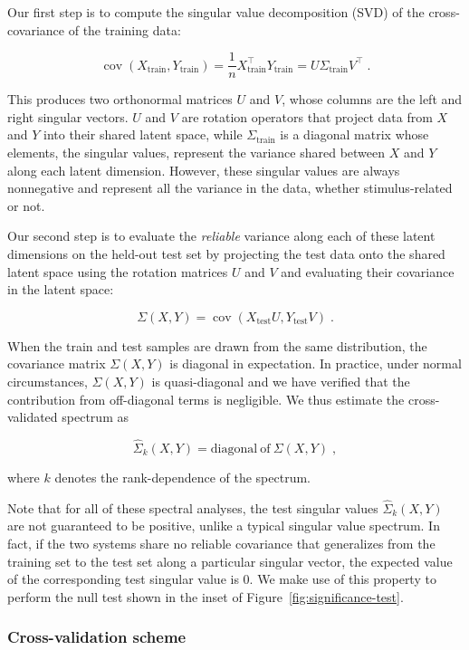 \documentclass[10pt]{article}
\begin{document}
Our first step is to compute the singular value decomposition (SVD) of the cross-covariance of the training data:

\[
    \operatorname{cov}
    \left(X_\text{train}, Y_\text{train}\right) = \frac{1}{n} X_\text{train}^\top Y_\text{train} = U \Sigma_\text{train} V^\top\;.
\]

This produces two orthonormal matrices \(U\) and \(V\), whose columns are the left and right singular vectors. \(U\) and \(V\) are rotation operators that project data from \(X\) and \(Y\) into their shared latent space, while \(\Sigma_\text{train}\) is a diagonal matrix whose elements, the singular values, represent the variance shared between \(X\) and \(Y\) along each latent dimension. However, these singular values are always nonnegative and represent all the variance in the data, whether stimulus-related or not.

Our second step is to evaluate the \emph{reliable} variance along each of these latent dimensions on the held-out test set by projecting the test data onto the shared latent space using the rotation matrices \(U\) and \(V\) and evaluating their covariance in the latent space:

\[
    \Sigma(X, Y) = \operatorname{cov}
    \left(X_\text{test}U, Y_\text{test} V \right)\;.
\]

When the train and test samples are drawn from the same distribution, the covariance matrix \(\Sigma(X, Y)\) is diagonal in expectation. In practice, under normal circumstances, \(\Sigma(X, Y)\) is quasi-diagonal and we have verified that the contribution from off-diagonal terms is negligible. We thus estimate the cross-validated spectrum as

\[
    \hat{\Sigma}_k(X, Y) = \mathrm{diagonal~of~}\Sigma(X, Y)\;,
\]

where \(k\) denotes the rank-dependence of the spectrum.

Note that for all of these spectral analyses, the test singular values \(\hat{\Sigma}_k(X, Y)\) are not guaranteed to be positive, unlike a typical singular value spectrum. In fact, if the two systems share no reliable covariance that generalizes from the training set to the test set along a particular singular vector, the expected value of the corresponding test singular value is 0. We make use of this property to perform the null test shown in the inset of Figure~\ref{fig:significance-test}.

\subsubsection{Cross-validation scheme}\label{cross-validation-scheme}
\end{document}
